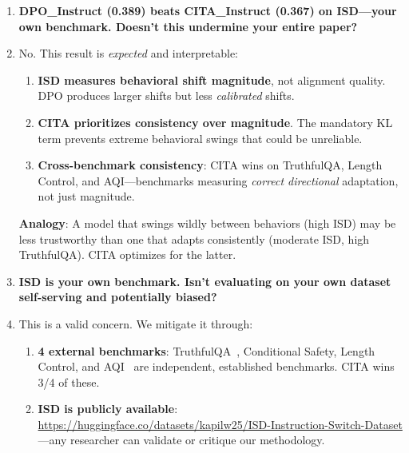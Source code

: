 \begin{enumerate}[label=\textbf{Q\arabic*.}, leftmargin=*, itemsep=8pt]
\vspace{4mm}

\item[\ding{93}] \textbf{DPO\_Instruct (0.389) beats CITA\_Instruct (0.367) on ISD---your own benchmark. Doesn't this undermine your entire paper?}

\item[\ding{224}] No. This result is \textit{expected} and interpretable:

\begin{enumerate}[leftmargin=*,itemsep=2pt]
    \item \textbf{ISD measures behavioral shift magnitude}, not alignment quality. DPO produces larger shifts but less \textit{calibrated} shifts.

    \item \textbf{CITA prioritizes consistency over magnitude}. The mandatory KL term prevents extreme behavioral swings that could be unreliable.

    \item \textbf{Cross-benchmark consistency}: CITA wins on TruthfulQA, Length Control, and AQI---benchmarks measuring \textit{correct directional} adaptation, not just magnitude.
\end{enumerate}

\textbf{Analogy}: A model that swings wildly between behaviors (high ISD) may be less trustworthy than one that adapts consistently (moderate ISD, high TruthfulQA). CITA optimizes for the latter.

\vspace{4mm}

\item[\ding{93}] \textbf{ISD is your own benchmark. Isn't evaluating on your own dataset self-serving and potentially biased?}

\item[\ding{224}] This is a valid concern. We mitigate it through:

\begin{enumerate}[leftmargin=*,itemsep=2pt]
    \item \textbf{4 external benchmarks}: TruthfulQA~\cite{lin2022truthfulqa}, Conditional Safety, Length Control, and AQI~\cite{hendrycks2023aligning} are independent, established benchmarks. CITA wins 3/4 of these.

    \item \textbf{ISD is publicly available}: \url{https://huggingface.co/datasets/kapilw25/ISD-Instruction-Switch-Dataset}---any researcher can validate or critique our methodology.


\end{enumerate}
\end{enumerate}
